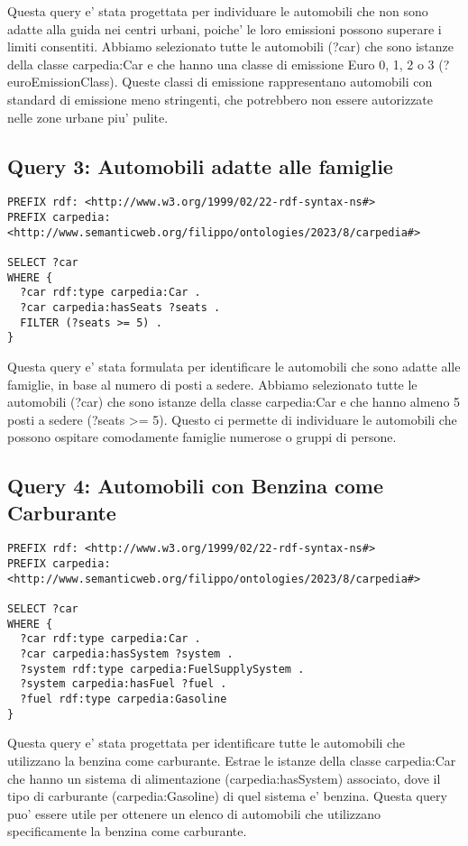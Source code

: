 Questa query e' stata progettata per individuare le automobili che non sono adatte alla guida nei centri urbani,
poiche' le loro emissioni possono superare i limiti consentiti.
Abbiamo selezionato tutte le automobili (?car) che sono istanze della classe carpedia:Car e che hanno una
classe di emissione Euro 0, 1, 2 o 3 (?euroEmissionClass).
Queste classi di emissione rappresentano automobili con standard di emissione meno stringenti,
che potrebbero non essere autorizzate nelle zone urbane piu' pulite.

\subsection{Query 3: Automobili adatte alle famiglie}

\begin{verbatim}
PREFIX rdf: <http://www.w3.org/1999/02/22-rdf-syntax-ns#>
PREFIX carpedia: <http://www.semanticweb.org/filippo/ontologies/2023/8/carpedia#>

SELECT ?car
WHERE {
  ?car rdf:type carpedia:Car .
  ?car carpedia:hasSeats ?seats .
  FILTER (?seats >= 5) .
}
\end{verbatim}


Questa query e' stata formulata per identificare le automobili che sono adatte alle famiglie, in base al numero
di posti a sedere. Abbiamo selezionato tutte le automobili (?car) che sono istanze della classe carpedia:Car e
che hanno almeno 5 posti a sedere (?seats >= 5). Questo ci permette di individuare le automobili che possono
ospitare comodamente famiglie numerose o gruppi di persone.

\subsection{Query 4: Automobili con Benzina come Carburante}

\begin{verbatim}
PREFIX rdf: <http://www.w3.org/1999/02/22-rdf-syntax-ns#>
PREFIX carpedia: <http://www.semanticweb.org/filippo/ontologies/2023/8/carpedia#>

SELECT ?car
WHERE {
  ?car rdf:type carpedia:Car .
  ?car carpedia:hasSystem ?system .
  ?system rdf:type carpedia:FuelSupplySystem .
  ?system carpedia:hasFuel ?fuel .
  ?fuel rdf:type carpedia:Gasoline
}
\end{verbatim}


Questa query e' stata progettata per identificare tutte le automobili che utilizzano la benzina come carburante.
Estrae le istanze della classe carpedia:Car che hanno un sistema di alimentazione (carpedia:hasSystem) associato,
dove il tipo di carburante (carpedia:Gasoline) di quel sistema e' benzina.
Questa query puo' essere utile per ottenere un elenco di automobili che utilizzano specificamente la benzina
come carburante.

